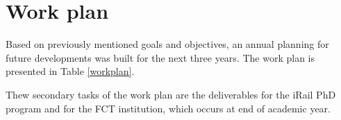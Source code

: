 	

\newpage
\section{Work plan}
\label{sec:44}

Based on previously mentioned goals and objectives, an annual planning for future developments was built for the next three years. 
The work plan is presented in Table \ref{workplan}. 


Thew secondary tasks of the work plan are the deliverables for the iRail PhD program and for the FCT institution, which occurs at end of academic year. 






